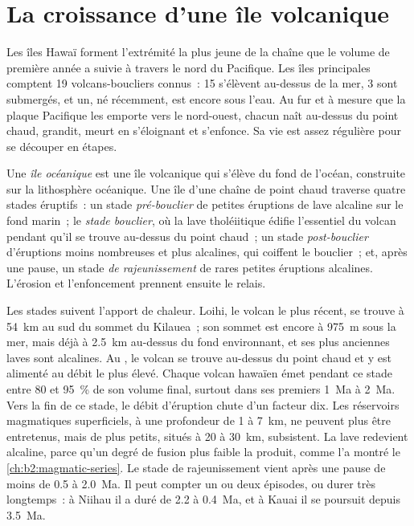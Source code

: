 \section{La croissance d'une île volcanique}\label{sec:b2:oceanic-islands:growth}

Les îles Hawaï forment l'extrémité la plus jeune de la chaîne que le volume de première année a
suivie à travers le nord du Pacifique. Les îles principales comptent 19 volcans-boucliers connus~: 15
s'élèvent au-dessus de la mer, 3 sont submergés, et un, né récemment, est encore sous l'eau. Au fur et
à mesure que la plaque Pacifique les emporte vers le nord-ouest, chacun naît au-dessus du point chaud,
grandit, meurt en s'éloignant et s'enfonce. Sa vie est assez régulière pour se découper en étapes.

\begin{definition}\label{def:b2:oceanic-islands:stages}
Une \emph{île océanique} est une île volcanique qui s'élève du fond de l'océan,
construite sur la lithosphère océanique. Une île d'une chaîne de point chaud traverse quatre stades
éruptifs~: un stade \emph{pré-bouclier} de petites éruptions de lave alcaline sur le fond marin~; le
\emph{stade bouclier}, où la lave tholéiitique édifie l'essentiel du volcan pendant
qu'il se trouve au-dessus du point chaud~; un stade \emph{post-bouclier} d'éruptions moins nombreuses
et plus alcalines, qui coiffent le bouclier~; et, après une pause, un stade \emph{de rajeunissement}
de rares petites éruptions alcalines. L'érosion et l'enfoncement prennent ensuite le relais.
\end{definition}

Les stades suivent l'apport de chaleur. Loihi, le volcan le plus récent, se trouve à \qty{54}{km} au sud du
sommet du Kilauea~; son sommet est encore à \qty{975}{m} sous la mer, mais déjà à \qty{2.5}{km} au-dessus
du fond environnant, et ses plus anciennes laves sont alcalines. Au , le volcan se trouve
au-dessus du point chaud et y est alimenté au débit le plus élevé. Chaque volcan hawaïen émet pendant ce stade
entre 80 et \qty{95}{\percent} de son volume final, surtout dans ses premiers \qty{1}{Ma} à \qty{2}{Ma}.
Vers la fin de ce stade, le débit d'éruption chute d'un facteur dix. Les réservoirs magmatiques
superficiels, à une profondeur de 1 à \qty{7}{km}, ne peuvent plus être entretenus, mais de plus petits,
situés à 20 à \qty{30}{km}, subsistent. La lave redevient alcaline, parce qu'un degré de fusion plus
faible la produit, comme l'a montré le \cref{ch:b2:magmatic-series}. Le stade de rajeunissement vient
après une pause de moins de 0.5 à \qty{2.0}{Ma}. Il peut compter un ou deux épisodes, ou durer très
longtemps~: à Niihau il a duré de 2.2 à \qty{0.4}{Ma}, et à Kauai il se poursuit depuis \qty{3.5}{Ma}.

